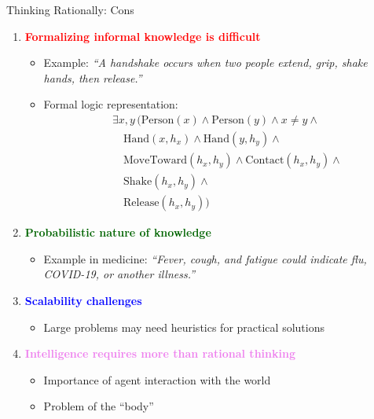 \documentclass[
  10pt,
  ignorenonframetext,
]{beamer}
\providecommand{\tightlist}{%
  \setlength{\itemsep}{0pt}\setlength{\parskip}{0pt}}
\begin{document}
\begin{frame}{Thinking Rationally: Cons}
\label{thinking-rationally-cons}
\begin{enumerate}
\tightlist
\item
  \textbf{\textcolor{red}{Formalizing informal knowledge is difficult}}

  \begin{itemize}
  \tightlist
  \item
    Example: \emph{``A handshake occurs when two people extend, grip,
    shake hands, then release.''}
  \item
    Formal logic representation: \begin{align*}
        &\exists x, y \, ( \text{Person}(x) \land \text{Person}(y) \land x \neq y \land \\
        &\quad \text{Hand}(x, h_x) \land \text{Hand}(y, h_y) \land \\
        &\quad \text{MoveToward}(h_x, h_y) \land \text{Contact}(h_x, h_y) \land \\
        &\quad \text{Shake}(h_x, h_y) \land \\
        &\quad \text{Release}(h_x, h_y) )
    \end{align*}
  \end{itemize}
\item
  \textbf{\textcolor{darkgreen}{Probabilistic nature of knowledge}}

  \begin{itemize}
  \tightlist
  \item
    Example in medicine: \emph{``Fever, cough, and fatigue could
    indicate flu, COVID-19, or another illness.''}
  \end{itemize}
\item
  \textbf{\textcolor{blue}{Scalability challenges}}

  \begin{itemize}
  \tightlist
  \item
    Large problems may need heuristics for practical solutions
  \end{itemize}
\item
  \textbf{\textcolor{violet}{Intelligence requires more than rational thinking}}

  \begin{itemize}
  \tightlist
  \item
    Importance of agent interaction with the world
  \item
    Problem of the ``body''
  \end{itemize}
\end{enumerate}
\end{frame}
\end{document}
